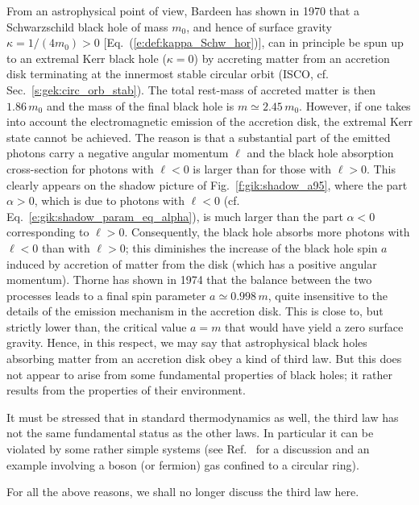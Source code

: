 From an astrophysical point of view, Bardeen has shown in 1970 \cite{Barde70a}
that a Schwarzschild black hole
of mass $m_0$, and hence of surface gravity $\kappa = 1/(4m_0) > 0$ [Eq.~(\ref{e:def:kappa_Schw_hor})],
can in principle be spun up to an extremal Kerr black hole
($\kappa = 0$)
by accreting matter from an accretion disk
terminating at the innermost stable circular orbit (ISCO, cf. Sec.~\ref{s:gek:circ_orb_stab}). The total rest-mass of accreted matter is then
$1.86\, m_0$ and the mass of the final black hole is $m \simeq 2.45\, m_0$.
However, if one takes into account the electromagnetic emission of the accretion disk, the extremal Kerr state
cannot be achieved. The reason is that a substantial part of the emitted photons carry a negative angular momentum $\ell$ and
the black hole absorption cross-section for photons with $\ell<0$ is larger than for those with
$\ell>0$. This clearly appears on the shadow picture of Fig.~\ref{f:gik:shadow_a95},
where the part $\alpha>0$, which is due to photons
with $\ell < 0$ (cf. Eq.~\ref{e:gik:shadow_param_eq_alpha}), is much larger than the part $\alpha<0$
corresponding to $\ell > 0$. Consequently, the black hole absorbs more photons with $\ell < 0$
than with $\ell>0$; this diminishes the increase of the black hole spin $a$ induced by accretion of  matter from the disk (which has a positive angular momentum). Thorne has shown in 1974 \cite{Thorn74} that the balance between the two processes leads to a final spin parameter $a \simeq 0.998 \, m$, quite insensitive to the details
of the emission mechanism in the accretion disk. This is close to, but strictly lower than, the critical
value $a = m$ that would have yield a zero surface gravity. Hence, in this respect, we may say that
astrophysical black holes absorbing matter from an accretion disk obey a kind of third law.
But this does not appear to arise from some fundamental properties of black holes; it rather results from the properties of their environment.

It must be stressed that in standard thermodynamics as well, the third law has not the same fundamental status as the other laws.
In particular it can be violated by some rather simple systems (see Ref.~\cite{Wald97} for a discussion and an example involving a boson (or fermion) gas confined to a circular ring).

For all the above reasons, we shall no longer discuss the third law here.


